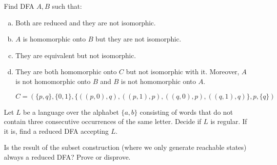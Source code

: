\documentclass[a4paper,12pt]{amsart}
\begin{document}
\medskip\begin{problem} 
    
    Find DFA $A,B$ such that:
    
    \medskip
    
    \begin{enumerate}[(a)]\setlength\itemsep{6pt}
        \item Both are reduced and they are not isomorphic. 
        \item $A$ is homomorphic onto $B$ but they are not isomorphic.
        \item They are equivalent but not isomorphic.
        \item They are both homomorphic onto $C$ but not isomorphic with it. Moreover, $A$ is not homomorphic onto $B$ and $B$ is not homomorphic onto $A$.

        $$
        C=(\{p,q\},\{0,1\},\{((p,0),q),((p,1),p),((q,0),p),((q,1),q)\},p,\{q\})
        $$
    \end{enumerate}

\end{problem}


\medskip\begin{problem}
    
    Let $L$ be a language over the alphabet $\{a,b\}$ consisting of words that do not contain three consecutive occurrences of the same letter. Decide if $L$ is regular. If it is, find a reduced DFA accepting $L$.

\end{problem}


\medskip\begin{problem}
    
    Is the result of the subset construction (where we only generate reachable states) always a reduced DFA? Prove or disprove.

\end{problem}
\end{document}
